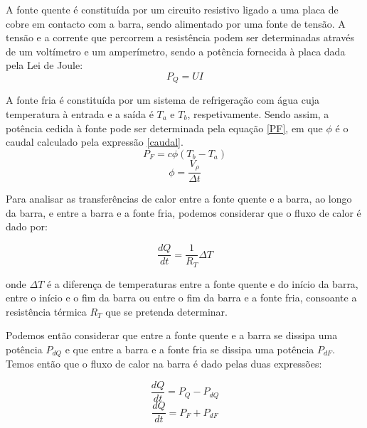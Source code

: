 \documentclass[8pt]{extarticle}
\begin{document}
\begin{multicols}{2}
\par A fonte quente é constituída por um circuito resistivo ligado a uma placa de cobre em contacto com a barra, sendo alimentado por uma fonte de tensão. A tensão e a corrente que percorrem a resistência podem ser determinadas através de um voltímetro e um amperímetro, sendo a potência fornecida à placa dada pela Lei de Joule:
\begin{equation} \label{PQ}
P_Q = U I
\end{equation}
\par A fonte fria é constituída por um sistema de refrigeração com água cuja temperatura à entrada e a saída é $T_a$ e $T_b$, respetivamente. Sendo assim, a potência cedida à fonte pode ser determinada pela equação \ref{PF}, em que $\phi$ é o caudal calculado pela expressão \ref{caudal}.
\begin{equation}\label{PF}
P_F = c \phi (T_b - T_a)
\end{equation}
\begin{equation} \label{caudal}
\phi = \frac{V_\rho}{\Delta t}
\end{equation}

\par Para analisar as transferências de calor entre a fonte quente e a barra, ao longo da barra, e entre a barra e a fonte fria, podemos considerar que o fluxo de calor é dado por:

\begin{equation} \label{RT}
\frac{dQ}{dt}=\frac{1}{R_T}\Delta T
\end{equation}

\par\nointent onde $\Delta T$ é a diferença de temperaturas entre a fonte quente e do início da barra, entre o início e o fim da barra ou entre o fim da barra e a fonte fria, consoante a resistência térmica $R_T$ que se pretenda determinar.

\par Podemos então considerar que entre a fonte quente e a barra se dissipa uma potência $P_{dQ}$ e que entre a barra e a fonte fria se dissipa uma potência $P_{dF}$. Temos então que o fluxo de calor na barra é dado pelas duas expressões:

\begin{equation} \label{A}
\frac{dQ}{dt}=P_Q-P_{dQ}
\end{equation}
\begin{equation} \label{B}
\frac{dQ}{dt}=P_F+P_{dF}
\end{equation}


\end{multicols}
\end{document}
